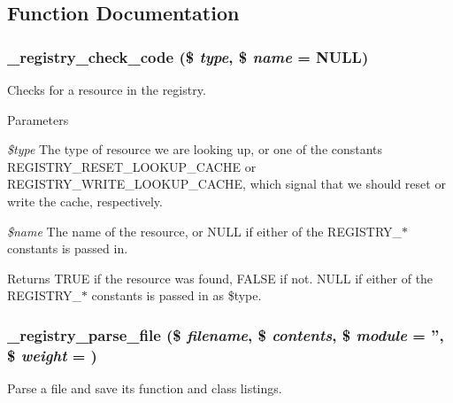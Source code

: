 \subsection{Function Documentation}
\hypertarget{group__registry_gac399c501a8a90c383ea9a901a3a45ed6}{
\subsubsection[{\_\-registry\_\-check\_\-code}]{\setlength{\rightskip}{0pt plus 5cm}\_\-registry\_\-check\_\-code (\$ {\em type}, \/  \$ {\em name} = {\ttfamily NULL})}}
\label{group__registry_gac399c501a8a90c383ea9a901a3a45ed6}
Checks for a resource in the registry.


\begin{DoxyParams}{Parameters}
\item[{\em \$type}]The type of resource we are looking up, or one of the constants REGISTRY\_\-RESET\_\-LOOKUP\_\-CACHE or REGISTRY\_\-WRITE\_\-LOOKUP\_\-CACHE, which signal that we should reset or write the cache, respectively. \item[{\em \$name}]The name of the resource, or NULL if either of the REGISTRY\_\-$\ast$ constants is passed in.\end{DoxyParams}
\begin{DoxyReturn}{Returns}
TRUE if the resource was found, FALSE if not. NULL if either of the REGISTRY\_\-$\ast$ constants is passed in as \$type. 
\end{DoxyReturn}
\hypertarget{group__registry_ga9836752d4694599ffe4c393ff037fd44}{
\subsubsection[{\_\-registry\_\-parse\_\-file}]{\setlength{\rightskip}{0pt plus 5cm}\_\-registry\_\-parse\_\-file (\$ {\em filename}, \/  \$ {\em contents}, \/  \$ {\em module} = {\ttfamily ''}, \/  \$ {\em weight} = {})}}
\label{group__registry_ga9836752d4694599ffe4c393ff037fd44}
Parse a file and save its function and class listings.


